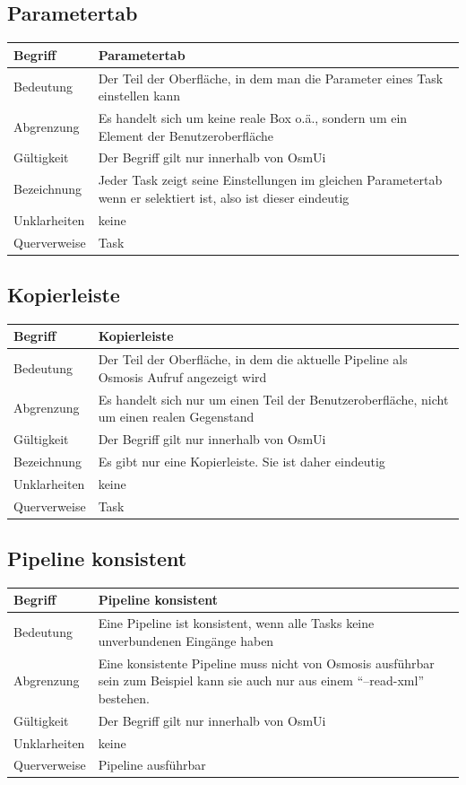 \documentclass[a4paper,12pt]{scrartcl}
\begin{document}
\begin{center}
\subsection{Parametertab}
\begin{tabular}{|p{5cm}|p{10cm}|}
\hline Begriff & \textbf{Parametertab} \\ 
\hline Bedeutung & Der Teil der Oberfläche, in dem man die Parameter eines Task einstellen kann  \\ 
\hline Abgrenzung & Es handelt sich um keine reale Box o.ä., sondern um ein Element der Benutzeroberfläche\\ 
\hline Gültigkeit & Der Begriff gilt nur innerhalb von OsmUi \\ 
\hline Bezeichnung & Jeder Task zeigt seine Einstellungen im gleichen Parametertab wenn er selektiert ist, also ist dieser eindeutig \\ 
\hline Unklarheiten & keine \\ 
\hline Querverweise & Task \\ 
\hline 
\end{tabular}
\subsection{Kopierleiste}
\begin{tabular}{|p{5cm}|p{10cm}|}
\hline Begriff & \textbf{Kopierleiste} \\ 
\hline Bedeutung & Der Teil der Oberfläche, in dem die aktuelle Pipeline als Osmosis Aufruf angezeigt wird \\ 
\hline Abgrenzung & Es handelt sich nur um einen Teil der Benutzeroberfläche, nicht um einen realen Gegenstand \\ 
\hline Gültigkeit & Der Begriff gilt nur innerhalb von OsmUi \\ 
\hline Bezeichnung & Es gibt nur eine Kopierleiste. Sie ist daher eindeutig \\ 
\hline Unklarheiten & keine \\ 
\hline Querverweise & Task \\ 
\hline 
\end{tabular}
\subsection{Pipeline konsistent}
\begin{tabular}{|p{5cm}|p{10cm}|}
\hline Begriff & \textbf{Pipeline konsistent} \\ 
\hline Bedeutung & Eine Pipeline ist konsistent, wenn alle Tasks keine unverbundenen Eingänge haben \\ 
\hline Abgrenzung & Eine konsistente Pipeline muss nicht von Osmosis ausführbar sein
\newline zum Beispiel kann sie auch nur aus einem ``--read-xml'' bestehen. \\ 
\hline Gültigkeit & Der Begriff gilt nur innerhalb von OsmUi \\  
\hline Unklarheiten & keine \\ 
\hline Querverweise & Pipeline ausführbar \\ 
\hline 
\end{tabular}

\end{center}
\end{document}
